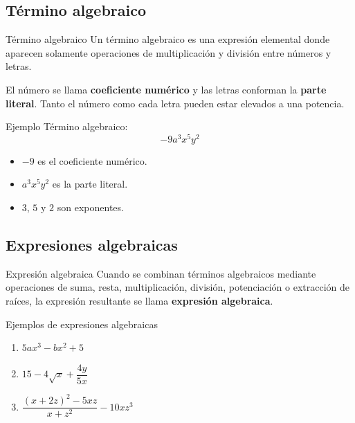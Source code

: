 \documentclass[10pt,handout,aspectratio=169]{beamer}
\begin{document}
	\subsection{Término algebraico}
	
	\begin{frame}{Término algebraico}
		Un término algebraico es una expresión elemental donde aparecen solamente operaciones de multiplicación y división entre números y letras. 
		
		\bigskip
		
		El número se llama \textbf{coeficiente numérico} y las letras conforman la \textbf{parte literal}. Tanto el número como cada letra pueden estar elevados a una potencia.
		
		\begin{block}{Ejemplo}
			Término algebraico: \[
			-9a^{3}x^{5}y^{2}
			\]
			
			\begin{itemize}
				\item $-9$ es el coeficiente numérico.
				\item $a^{3}x^{5}y^{2}$ es la parte literal.
				\item $3$, $5$ y $2$ son exponentes.
			\end{itemize}
		\end{block}
	\end{frame}
	
	\subsection{Expresiones algebraicas}
	
	\begin{frame}{Expresión algebraica}
		Cuando se combinan términos algebraicos mediante operaciones de suma, resta, multiplicación, división, potenciación o extracción de raíces, la expresión resultante se llama \textbf{expresión algebraica}.
		
		\begin{block}{Ejemplos de expresiones algebraicas}
			\begin{enumerate}
				\item $5ax^{3}-bx^{2}+5$
				\item $15-4\sqrt{x}+\dfrac{4y}{5x}$
				\item $\dfrac{(x+2z)^{2}-5xz}{x+z^{2}}-10xz^{3}$
			\end{enumerate}
		\end{block}
	\end{frame}
	
\end{document}
